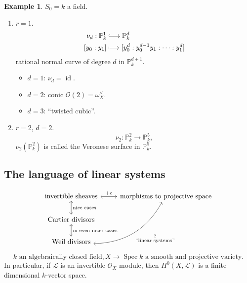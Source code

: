 \documentclass[12pt]{article}
\DeclareMathOperator{\id}{id}
\DeclareMathOperator{\Spec}{Spec}
\theoremstyle{definition}
\newtheorem*{example}{Example}
\begin{document}
\begin{example}
$S_0=k$ a field.

\begin{enumerate}[label=\arabic*)]
\item $r=1$.
\begin{align*}
\nu_d:\mathbb P_k^1&\lhook\joinrel\longrightarrow\mathbb P_k^d\\ [y_0:y_1]&\longmapsto[y_0^d:y_0^{d-1}y_1:\cdots:y_1^d]
\end{align*}
rational normal curve of degree $d$ in $\mathbb P_k^{d+1}$.

\begin{itemize}
\item $d=1$: $\nu_d=\id$.

\item $d=2$: conic $\mathcal O(2)=\omega_X^\vee$.

\item $d=3$: ``twisted cubic''.
\end{itemize}

\item $r=2$, $d=2$.
\[\nu_2:\mathbb P_k^2\longrightarrow\mathbb P_k^5,\]
$\nu_2(\mathbb P_k^2)$ is called the Veronese surface in $\mathbb P_k^5$.
\end{enumerate}
\end{example}

\subsection*{The language of linear systems}
\[\begin{tikzcd}\text{invertible sheaves}\arrow[r,<->,"+\epsilon"]\arrow[d,<->,"\text{nice cases}"]&\text{morphisms to projective space}\\\text{Cartier divisors}\arrow[d,<->,"\text{in even nicer cases}"]\\\text{Weil divisors}\arrow[ruu,<->,bend right,"\substack{\text?\\\text{``linear systems''}}",swap]\end{tikzcd}\]

\begin{equation}\tag{$**$}\label{condition_smooth_proj}
k\text{ an algebraically closed field},X\longrightarrow\Spec k\text{ a smooth and projective variety}.
\end{equation}
In particular, if $\mathcal L$ is an invertible $\mathcal O_X$-module, then $H^0(X,\mathcal L)$ is a finite-dimensional $k$-vector space.
\end{document}
